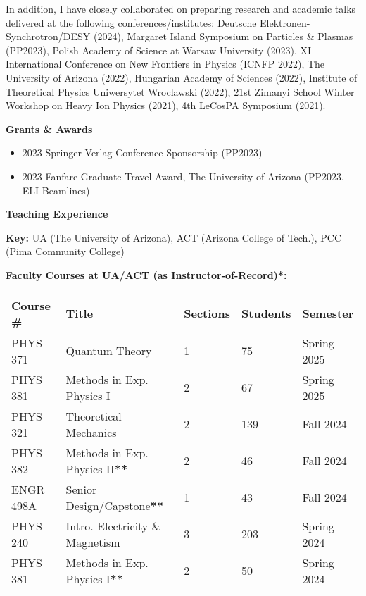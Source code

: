\documentclass[11pt]{article}
\begin{document}
\noindent In addition, I have closely collaborated on preparing research and academic talks delivered at the following conferences/institutes: Deutsche Elektronen-Synchrotron/DESY (2024), Margaret Island Symposium on Particles \& Plasmas (PP2023), Polish Academy of Science at Warsaw University (2023), XI International Conference on New Frontiers in Physics (ICNFP 2022), The University of Arizona (2022), Hungarian Academy of Sciences (2022), Institute of Theoretical Physics Uniwersytet Wroclawski (2022), 21st Zimanyi School Winter Workshop on Heavy Ion Physics (2021), 4th LeCosPA Symposium (2021).

\medskip

{\Large\textbf{Grants \& Awards}}

\begin{itemize}[leftmargin=*,nosep]
    \item 2023 Springer-Verlag Conference Sponsorship (PP2023)
    \item 2023 Fanfare Graduate Travel Award, The University of Arizona (PP2023, ELI-Beamlines)
\end{itemize}

\medskip

{\Large\textbf{Teaching Experience}}

\textbf{Key:} UA (The University of Arizona), ACT (Arizona College of Tech.), PCC (Pima Community College)

\textbf{Faculty Courses at UA/ACT (as Instructor-of-Record)*:}\\
{\normalsize
\begin{tabular}{@{}p{2.5cm} p{6.0cm} p{2.0cm} p{2.0cm} p{3.0cm}@{}}
    \toprule
    \textbf{Course \#} & \textbf{Title} & \textbf{Sections} & \textbf{Students} & \textbf{Semester} \\
    \midrule
    PHYS 371   & Quantum Theory                    & 1 & 75  & Spring 2025 \\
    PHYS 381   & Methods in Exp. Physics I         & 2 & 67  & Spring 2025 \\
    PHYS 321   & Theoretical Mechanics             & 2 & 139 & Fall 2024 \\
    PHYS 382   & Methods in Exp. Physics II\textbf{**}       & 2 & 46  & Fall 2024 \\
    ENGR 498A  & Senior Design/Capstone\textbf{**}           & 1 & 43  & Fall 2024 \\
    PHYS 240   & Intro. Electricity \& Magnetism    & 3 & 203 & Spring 2024 \\
    PHYS 381   & Methods in Exp. Physics I\textbf{**}        & 2 & 50  & Spring 2024 \\
    \bottomrule
\end{tabular}
}\\[0.0em]
\end{document}
